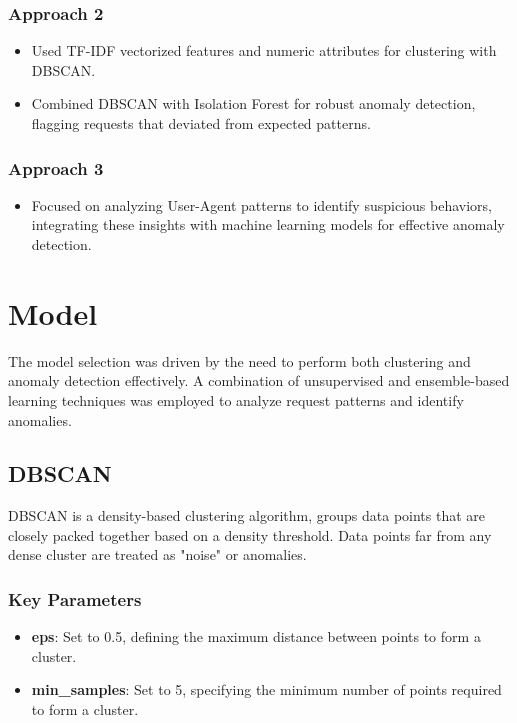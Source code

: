\subsubsection{Approach 2}
\begin{itemize}
	\item Used TF-IDF vectorized features and numeric attributes for clustering with DBSCAN.
	\item Combined DBSCAN with Isolation Forest for robust anomaly detection, flagging requests that deviated from expected patterns.
\end{itemize}
\subsubsection{Approach 3}
\begin{itemize}
	\item Focused on analyzing User-Agent patterns to identify suspicious behaviors, integrating these insights with machine learning models for effective anomaly detection.
\end{itemize}

\section{Model}
The model selection was driven by the need to perform both clustering and anomaly detection effectively. A combination of unsupervised and ensemble-based learning techniques was employed to analyze request patterns and identify anomalies.

\subsection{DBSCAN}
DBSCAN is a density-based clustering algorithm, groups data points that are closely packed together based on a density threshold. Data points far from any dense cluster are treated as "noise" or anomalies.


\subsubsection{Key Parameters}
\begin{itemize}
	\item \textbf{eps}: Set to 0.5, defining the maximum distance between points to form a cluster.
	\item \textbf{min\_samples}: Set to 5, specifying the minimum number of points required to form a cluster.
\end{itemize}
